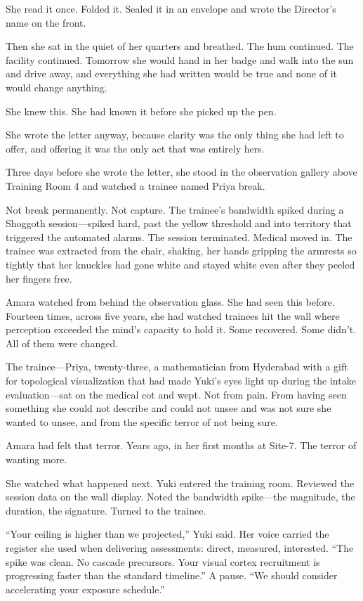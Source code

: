 She read it once. Folded it. Sealed it in an envelope and wrote the Director's name on the front.

Then she sat in the quiet of her quarters and breathed. The hum continued. The facility continued. Tomorrow she would hand in her badge and walk into the sun and drive away, and everything she had written would be true and none of it would change anything.

She knew this. She had known it before she picked up the pen.

She wrote the letter anyway, because clarity was the only thing she had left to offer, and offering it was the only act that was entirely hers.

\scenebreak

Three days before she wrote the letter, she stood in the observation gallery above Training Room 4 and watched a trainee named Priya break.

Not break permanently. Not capture. The trainee's bandwidth spiked during a Shoggoth session---spiked hard, past the yellow threshold and into territory that triggered the automated alarms. The session terminated. Medical moved in. The trainee was extracted from the chair, shaking, her hands gripping the armrests so tightly that her knuckles had gone white and stayed white even after they peeled her fingers free.

Amara watched from behind the observation glass. She had seen this before. Fourteen times, across five years, she had watched trainees hit the wall where perception exceeded the mind's capacity to hold it. Some recovered. Some didn't. All of them were changed.

The trainee---Priya, twenty-three, a mathematician from Hyderabad with a gift for topological visualization that had made Yuki's eyes light up during the intake evaluation---sat on the medical cot and wept. Not from pain. From having seen something she could not describe and could not unsee and was not sure she wanted to unsee, and from the specific terror of not being sure.

Amara had felt that terror. Years ago, in her first months at Site-7. The terror of wanting more.

She watched what happened next. Yuki entered the training room. Reviewed the session data on the wall display. Noted the bandwidth spike---the magnitude, the duration, the signature. Turned to the trainee.

``Your ceiling is higher than we projected,'' Yuki said. Her voice carried the register she used when delivering assessments: direct, measured, interested. ``The spike was clean. No cascade precursors. Your visual cortex recruitment is progressing faster than the standard timeline.'' A pause. ``We should consider accelerating your exposure schedule.''

